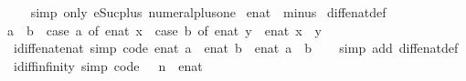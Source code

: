 \begin{isabellebody}
%
\isadelimproof
\ \ %
\endisadelimproof
%
\isatagproof
{}\isamarkupfalse%
\ {\isacharparenleft}simp\ only{\isacharcolon}\ eSuc{\isacharunderscore}plus{\isacharunderscore}{}\ numeral{\isacharunderscore}plus{\isacharunderscore}one{\isacharparenright}%
\endisatagproof
{\isafoldproof}%
%
\isadelimproof
%
\endisadelimproof
%
\isadelimdocument
%
\endisadelimdocument
%
\isatagdocument
%
\isamarkuptrue%
%
\endisatagdocument
{\isafolddocument}%
%
\isadelimdocument
%
\endisadelimdocument
{}\isamarkupfalse%
\ enat\ {\isacharcolon}{\isacharcolon}\ minus\isanewline
{}\isanewline
\isanewline
{}\isamarkupfalse%
\ diff{\isacharunderscore}enat{\isacharunderscore}def{\isacharcolon}\isanewline
{\isachardoublequoteopen}a\ {\isacharminus}\ b\ {\isacharequal}\ {\isacharparenleft}case\ a\ of\ {\isacharparenleft}enat\ x{\isacharparenright}\ {\isasymRightarrow}\ {\isacharparenleft}case\ b\ of\ {\isacharparenleft}enat\ y{\isacharparenright}\ {\isasymRightarrow}\ enat\ {\isacharparenleft}x\ {\isacharminus}\ y{\isacharparenright}\ {\isacharbar}\ {\isasyminfinity}\ {\isasymRightarrow}\ {}{\isacharparenright}\isanewline
\ \ \ \ \ \ \ \ \ \ {\isacharbar}\ {\isasyminfinity}\ {\isasymRightarrow}\ {\isasyminfinity}{\isacharparenright}{\isachardoublequoteclose}\isanewline
\isanewline
{}\isamarkupfalse%
%
\isadelimproof
\ %
\endisadelimproof
%
\isatagproof
\isacommand{{\isachardot}{\isachardot}}\isamarkupfalse%
%
\endisatagproof
{\isafoldproof}%
%
\isadelimproof
%
\endisadelimproof
\isanewline
\isanewline
{}\isamarkupfalse%
\isanewline
\isanewline
{}\isamarkupfalse%
\ idiff{\isacharunderscore}enat{\isacharunderscore}enat\ {\isacharbrackleft}simp{\isacharcomma}\ code{\isacharbrackright}{\isacharcolon}\ {\isachardoublequoteopen}enat\ a\ {\isacharminus}\ enat\ b\ {\isacharequal}\ enat\ {\isacharparenleft}a\ {\isacharminus}\ b{\isacharparenright}{\isachardoublequoteclose}\isanewline
%
\isadelimproof
\ \ %
\endisadelimproof
%
\isatagproof
{}\isamarkupfalse%
\ {\isacharparenleft}simp\ add{\isacharcolon}\ diff{\isacharunderscore}enat{\isacharunderscore}def{\isacharparenright}%
\endisatagproof
{\isafoldproof}%
%
\isadelimproof
\isanewline
%
\endisadelimproof
\isanewline
{}\isamarkupfalse%
\ idiff{\isacharunderscore}infinity\ {\isacharbrackleft}simp{\isacharcomma}\ code{\isacharbrackright}{\isacharcolon}\ {\isachardoublequoteopen}{\isasyminfinity}\ {\isacharminus}\ n\ {\isacharequal}\ {\isacharparenleft}{\isasyminfinity}{\isacharcolon}{\isacharcolon}enat{\isacharparenright}{\isachardoublequoteclose}\isanewline

\end{isabellebody}
